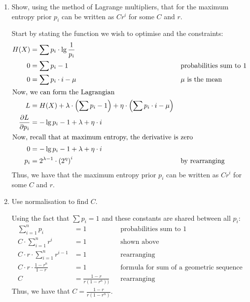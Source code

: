\documentclass[10pt,\jkfside,a4paper]{article}
\begin{document}
\begin{enumerate}
    \begin{enumerate}

        \item Show, using the method of Lagrange multipliers, that for the maximum entropy prior $p_i$ can be written as $C r^i$ for some $C$ and $r$.

        Start by stating the function we wish to optimise and the constraints:
        \begin{align*}
            H(X) &= \sum p_i \cdot \lg \frac{1}{p_i} \\
            0 &= \sum p_i - 1 && \text{probabilities sum to 1} \\
            0 &= \sum p_i \cdot i - \mu && \text{$\mu$ is the mean} \\
            \intertext{Now, we can form the Lagrangian}
            L &= H(X) + \lambda \cdot \left(\sum p_i - 1\right) + \eta \cdot \left(\sum p_i \cdot i - \mu\right) \\
            \frac{\partial L}{\partial p_i} &= -\lg p_i - 1 + \lambda + \eta \cdot i \\
            \intertext{Now, recall that at maximum entropy, the derivative is zero}
            0 &= -\lg p_i - 1 + \lambda + \eta \cdot i \\
            p_i &= 2^{\lambda - 1} \cdot \left( 2^\eta \right)^i && \text{by rearranging}
        \end{align*}
        Thus, we have that the maximum entropy prior $p_i$ can be written as $C r^i$ for some $C$ and $r$.

        \item Use normalisation to find $C$.

        Using the fact that $\sum p_i = 1$ and these constants are shared between all $p_i$:
        \begin{align}
            \sum^n_{i = 1} p_i &= 1 && \text{probabilities sum to 1} \\
            C \cdot \sum^n_{i = 1} r^i &= 1 && \text{shown above} \\
            C \cdot r \cdot \sum^n_{i = 1} r^{i - 1} &= 1 && \text{rearranging} \\
            C \cdot r \cdot \frac{1 - r^n}{1 - r} &= 1 && \text{formula for sum of a geometric sequence} \\
            C &= \frac{1 - r}{r(1 - r^n))} && \text{rearranging}
        \end{align}
        Thus, we have that $C = \frac{1 - r}{r(1 - r^n)}$.


\end{enumerate}
\end{enumerate}
\end{document}
